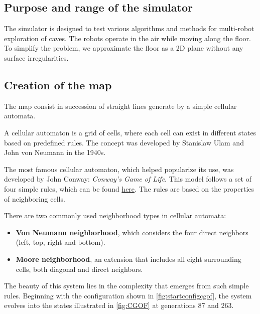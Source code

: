 \documentclass[../main.tex]{subfiles}
\begin{document}
\subsection{Purpose and range of the simulator}

The simulator is designed to test various algorithms and methods for multi-robot exploration of caves. The robots operate in the air while moving along the floor. To simplify the problem, we approximate the floor as a 2D plane without any surface irregularities.

\subsection{Creation of the map}

The map consist in succession of straight lines generate by a simple cellular automata. 

A cellular automaton is a grid of cells, where each cell can exist in different states based on predefined rules. The concept was developed by Stanislaw Ulam and John von Neumann in the 1940s.  

The most famous cellular automaton, which helped popularize its use, was developed by John Conway: \textit{Conway's Game of Life}. This model follows a set of four simple rules, which can be found \href{URL}{here}. The rules are based on the properties of neighboring cells.  

There are two commonly used neighborhood types in cellular automata:  
\begin{itemize}  
    \item \textbf{Von Neumann neighborhood}, which considers the four direct neighbors (left, top, right and bottom).  
    \item \textbf{Moore neighborhood}, an extension that includes all eight surrounding cells, both diagonal and direct neighbors.  
\end{itemize}


The beauty of this system lies in the complexity that emerges from such simple rules. Beginning with the configuration shown in \autoref{fig:startconfigcgof}, the system evolves into the states illustrated in \autoref{fig:CGOF} at generations 87 and 263.
\end{document}
